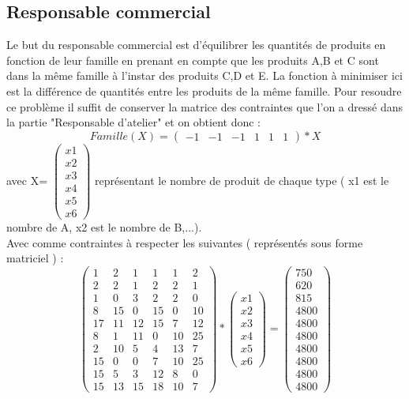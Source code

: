 \documentclass{article}
\begin{document}
\subsection{Responsable commercial}
Le but du responsable commercial est d'équilibrer les quantités de produits en fonction de leur famille en prenant en compte que les produits A,B et C sont dans la même famille à l'instar des produits C,D et E. La fonction à minimiser ici est la différence de quantités entre les produits de la même  famille.
Pour resoudre ce problème il suffit de conserver la matrice des contraintes que l'on a dressé dans la partie "Responsable d'atelier" et on obtient donc : 
\[
Famille(X) =
 \begin{pmatrix} 
   -1 & -1 & -1 & 1 & 1 & 1
   \end{pmatrix} *X
   \]
avec X= $\begin{pmatrix} 
   x1 \\ 
   x2 \\
   x3 \\
   x4 \\
   x5 \\ 
   x6 
  \end{pmatrix}$ représentant le nombre de produit de chaque type ( x1 est le nombre de A, x2 est le nombre de B,...). \\

Avec comme contraintes à respecter les suivantes ( représentés sous forme matriciel ) :
\[
\begin{pmatrix} 
   1 & 2 & 1 & 1 & 1 & 2 \\ 
   2 & 2 & 1 & 2 & 2 & 1 \\
   1 & 0 & 3 & 2 & 2 & 0 \\
   8 &15 & 0& 15& 0 & 10 \\
  17 & 11 & 12 & 15 & 7 & 12 \\
   8 & 1 & 11 & 0 & 10 & 25 \\
   2 & 10 & 5 & 4 & 13 & 7 \\
   15 & 0 & 0 & 7 & 10 & 25 \\
   15 & 5 & 3 & 12 & 8 & 0 \\
   15 & 13 & 15 & 18 & 10 & 7
\end{pmatrix} *\begin{pmatrix} 
   x1 \\ 
   x2 \\
   x3 \\
   x4 \\
   x5 \\ 
   x6 
  \end{pmatrix} = \begin{pmatrix} 
   750\\ 
   620 \\
   815 \\
   4800\\
   4800 \\ 
4800 \\ 
4800 \\ 
4800 \\ 
4800 \\ 
   4800
  \end{pmatrix}
   \]
\end{document}

